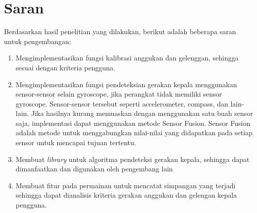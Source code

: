 \section{Saran}
\label{sec:saran}
Berdasarkan hasil penelitian yang dilakukan, berikut adalah beberapa saran untuk pengembangan:
\begin{enumerate}
    \item Mengimplementasikan fungsi kalibrasi anggukan dan gelenggan, sehingga sesuai dengan kriteria pengguna.
    \item Mengimplementasikan fungsi pendeteksian gerakan kepala menggunakan sensor-sensor selain gyroscope, jika perangkat tidak memiliki sensor gyroscope. Sensor-sensor tersebut seperti accelerometer, compass, dan lain-lain. Jika hasilnya kurang memuaskan dengan menggunakan satu buah sensor saja, implementasi dapat menggunakan metode Sensor Fusion. Sensor Fusion adalah metode untuk menggabungkan nilai-nilai yang didapatkan pada setiap sensor untuk mencapai tujuan tertentu.
    \item Membuat \textit{library} untuk algoritma pendeteksi gerakan kepala, sehingga dapat dimanfaatkan dan digunakan oleh pengembang lain
    \item Membuat fitur pada permainan untuk mencatat simpangan yang terjadi sehingga dapat dianalisis kriteria gerakan anggukan dan gelengan kepala pengguna.
\end{enumerate}